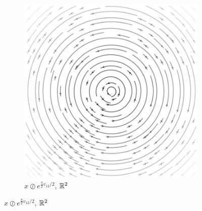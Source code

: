 \documentclass{juliacon}
\begin{document}
\begin{figure}[ht]
\begin{subfigure}[b]{0.23\textwidth}
		\includegraphics[width=\textwidth]{img/plane-2.png}
		\caption{$ x\oslash e^{\frac\pi2 v_{12}/2}$, $\mathbb{R}^2$}
	\end{subfigure}
	

\end{figure}
\end{document}

